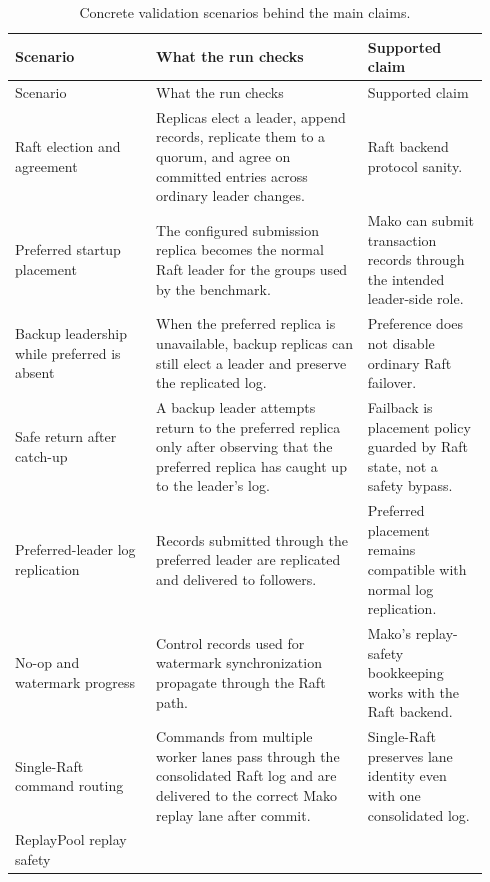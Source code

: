 \begingroup
\small
\setlength{\tabcolsep}{4pt}
\renewcommand{\arraystretch}{0.98}
\begin{longtable}{@{}>{\raggedright\arraybackslash}p{0.28\linewidth}
>{\raggedright\arraybackslash}p{0.42\linewidth}
>{\raggedright\arraybackslash}p{0.24\linewidth}@{}}
\caption[Concrete validation scenarios]{Concrete validation scenarios behind the main claims.}
\label{tab:validation-scenarios}\\
\toprule
Scenario & What the run checks & Supported claim \\
\midrule
\endfirsthead
\toprule
Scenario & What the run checks & Supported claim \\
\midrule
\endhead
Raft election and agreement &
Replicas elect a leader, append records, replicate them to a quorum, and agree on committed entries across ordinary leader changes. &
Raft backend protocol sanity. \\
\addlinespace
Preferred startup placement &
The configured submission replica becomes the normal Raft leader for the groups used by the benchmark. &
Mako can submit transaction records through the intended leader-side role. \\
\addlinespace
Backup leadership while preferred is absent &
When the preferred replica is unavailable, backup replicas can still elect a leader and preserve the replicated log. &
Preference does not disable ordinary Raft failover. \\
\addlinespace
Safe return after catch-up &
A backup leader attempts return to the preferred replica only after observing that the preferred replica has caught up to the leader's log. &
Failback is placement policy guarded by Raft state, not a safety bypass. \\
\addlinespace
Preferred-leader log replication &
Records submitted through the preferred leader are replicated and delivered to followers. &
Preferred placement remains compatible with normal log replication. \\
\addlinespace
No-op and watermark progress &
Control records used for watermark synchronization propagate through the Raft path. &
Mako's replay-safety bookkeeping works with the Raft backend. \\
\addlinespace
Single-Raft command routing &
Commands from multiple worker lanes pass through the consolidated Raft log and are delivered to the correct Mako replay lane after commit. &
Single-Raft preserves lane identity even with one consolidated log. \\
\addlinespace
ReplayPool replay safety &

\end{longtable}
